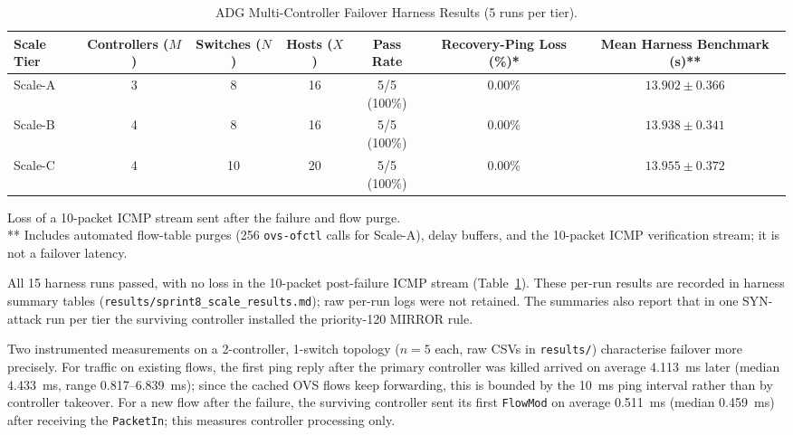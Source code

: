 \documentclass[conference]{IEEEtran}
\begin{document}
\begin{table}[htbp]
\centering
\caption{ADG Multi-Controller Failover Harness Results (5 runs per tier).}
\label{tab:adg_scale_results}
\setlength{\tabcolsep}{4pt}
\begin{tabular}{lcccccc}
\toprule
\textbf{Scale Tier} & \textbf{Controllers ($M$)} & \textbf{Switches ($N$)} & \textbf{Hosts ($X$)} & \textbf{Pass Rate} & \textbf{Recovery-Ping Loss (\%)*} & \textbf{Mean Harness Benchmark (s)**} \\
\midrule
Scale-A & 3 & 8 & 16 & 5/5 (100\%) & 0.00\% & $13.902 \pm 0.366$ \\
Scale-B & 4 & 8 & 16 & 5/5 (100\%) & 0.00\% & $13.938 \pm 0.341$ \\
Scale-C & 4 & 10 & 20 & 5/5 (100\%) & 0.00\% & $13.955 \pm 0.372$ \\
\bottomrule
\end{tabular}

\vspace{2pt}
\parbox{0.9\textwidth}{\small * Loss of a 10-packet ICMP stream sent after the failure and flow purge.\\
** Includes automated flow-table purges (256 \texttt{ovs-ofctl} calls for Scale-A), delay buffers, and the 10-packet ICMP verification stream; it is not a failover latency.}
\end{table}

All 15 harness runs passed, with no loss in the 10-packet post-failure ICMP stream (Table~\ref{tab:adg_scale_results}). These per-run results are recorded in harness summary tables (\texttt{results/sprint8\_scale\_results.md}); raw per-run logs were not retained. The summaries also report that in one SYN-attack run per tier the surviving controller installed the priority-120 MIRROR rule.

Two instrumented measurements on a 2-controller, 1-switch topology ($n=5$ each, raw CSVs in \texttt{results/}) characterise failover more precisely. For traffic on existing flows, the first ping reply after the primary controller was killed arrived on average 4.113~ms later (median 4.433~ms, range 0.817--6.839~ms); since the cached OVS flows keep forwarding, this is bounded by the 10~ms ping interval rather than by controller takeover. For a new flow after the failure, the surviving controller sent its first \texttt{FlowMod} on average 0.511~ms (median 0.459~ms) after receiving the \texttt{PacketIn}; this measures controller processing only.
\end{document}
